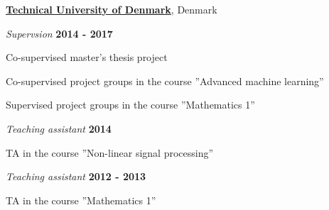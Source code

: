 \documentclass[10pt]{article}
\newcommand{\halfblankline}{\quad\vspace{-0.5\baselineskip}\pagebreak[3]}
\begin{document}
\href{http://www.dtu.dk/}{\textbf{Technical University of Denmark}},
Denmark
\begin{outerlist}

\item[] \textit{Supervsion}%
            \hfill \textbf{2014 - 2017}
                    \begin{innerlist}
            \item Co-supervised master's thesis project
            \item Co-supervised project groups in the course ''Advanced machine learning''
            \item Supervised project groups in the course ''Mathematics 1''
        \end{innerlist}




\item[] \textit{Teaching assistant}%
            \hfill \textbf{2014}
            \begin{innerlist}
                \item TA in the course ''Non-linear signal processing''
            \end{innerlist}

    \item[] \textit{Teaching assistant}%
            \hfill \textbf{2012 - 2013}
            \begin{innerlist}
                \item TA in the course ''Mathematics 1''
            \end{innerlist}
\end{outerlist}
\halfblankline
\end{document}

